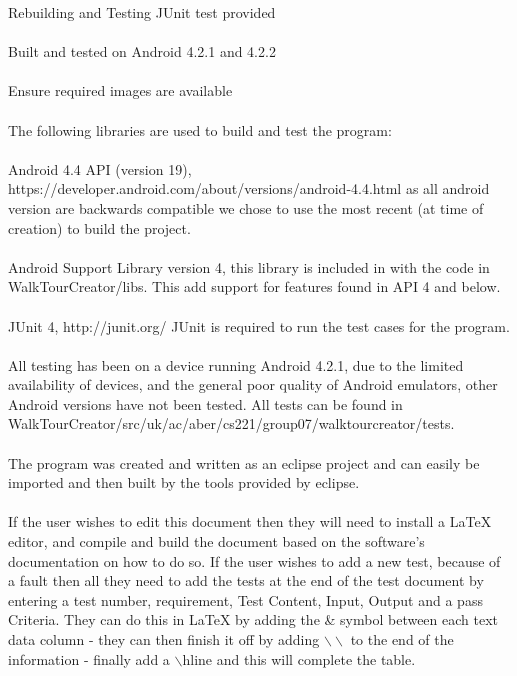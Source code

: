 \documentclass[12pt]{article}
\makeatletter
\renewcommand{\paragraph}{
  \@startsection{paragraph}{4}
  {\z@}{3.25ex \@plus -10em \@minus 1em}{0.1em}
  {\normalfont\normalsize\bfseries}
}
\makeatother
\begin{document}
\paragraph{Rebuilding and Testing}
JUnit test provided
\\\\
Built and tested on Android 4.2.1 and 4.2.2
\\\\
Ensure required images are available
\\\\
The following libraries are used to build and test the program:
\\\\
Android 4.4 API (version 19), https://developer.android.com/about/versions/android-4.4.html
as all android version are backwards compatible we chose to use the most recent (at time of creation) to build the project.
\\\\
Android Support Library version 4, this library is included in with the code in WalkTourCreator/libs.
This add support for features found in API 4 and below.
\\\\
JUnit 4, http://junit.org/
JUnit is required to run the test cases for the program.
\\\\
All testing has been on a device running Android 4.2.1, due to the limited availability of devices, and the general poor quality of Android emulators, other Android versions have not been tested. All tests can be found in WalkTourCreator/src/uk/ac/aber/cs221/group07/walktourcreator/tests.
\\\\
The program was created and written as an eclipse project and can easily be imported and then built by the tools provided by eclipse. 
\\\\ 
If the user wishes to edit this document then they will need to install a LaTeX editor,  and compile and build the document based on the software's documentation on how to do so. If the user wishes to add a new test, because of a fault then all they need to add the tests at the end of the test document by entering a test number, requirement, Test Content, Input, Output and a pass Criteria. They can do this in LaTeX by adding the \& symbol between each text data column - they can then finish it off by adding $\backslash \backslash$ to the end of the information - finally add a $\backslash$hline and this will complete the table.
\newpage
\end{document}
